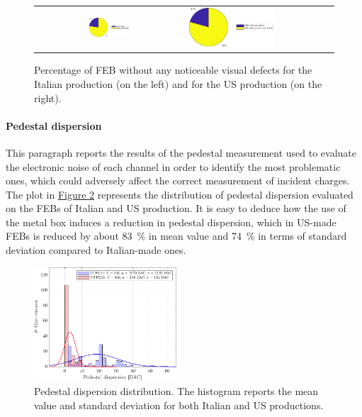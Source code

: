 \begin{figure}[h!]
    \centering
    \begin{tabular}{c p{8.6cm}}
        \includegraphics[width=0.285\textwidth]{Images/chap2/results/defects_number_IT.pdf} & \includegraphics[width=0.6\textwidth]{Images/chap2/results/defects_number_US.pdf}\\
    \end{tabular}
    \caption{Percentage of FEB without any noticeable visual defects for the Italian production (on the left) and for the US production (on the right).}
    \label{figFEBdefects2}
\end{figure}

\paragraph{Pedestal dispersion} This paragraph reports the results of the pedestal measurement used to evaluate the electronic noise of each channel in order to identify the most problematic ones, which could adversely affect the correct measurement of incident charges. The plot in \hyperref[figFEBpedestal]{Figure \ref{figFEBpedestal}} represents the distribution of pedestal dispersion evaluated on the FEBs of Italian and US production. It is easy to deduce how the use of the metal box induces a reduction in pedestal dispersion, which in US-made FEBs is reduced by about \SI{83}{\percent} in mean value and \SI{74}{\percent} in terms of standard deviation compared to Italian-made ones.

\begin{figure}[h!]
    \centering
    \includegraphics[width=0.475\textwidth]{Images/chap2/results/ped_disp.pdf}
    \caption{Pedestal dispersion distribution. The histogram reports the mean value and standard deviation for both Italian and US productions.}
    \label{figFEBpedestal}
\end{figure}

